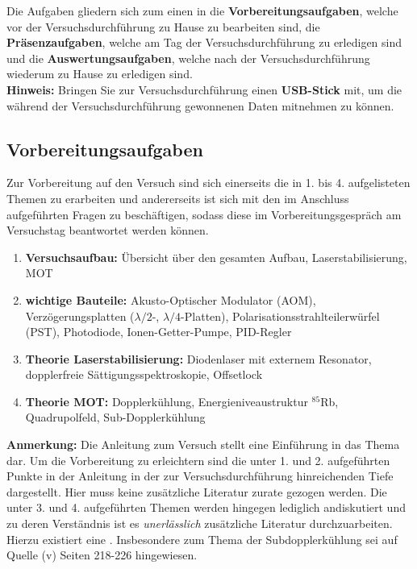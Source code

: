\documentclass[
class=book,
accentcolor=1b,
custommargins=geometry,
fontsize=11pt,
thesis={type=Versuchsanleitung},
ruledheaders=all,
headline=false,
instbox=false,
marginpar=false,
title=small,
ignore-missing-data=true,
twoside=false,
pdfa=false %
]{apqpub}
\begin{document}
Die Aufgaben gliedern sich zum einen in die \textbf{Vorbereitungsaufgaben}, welche vor der Versuchsdurchführung zu Hause zu bearbeiten sind, die \textbf{Präsenzaufgaben}, welche am Tag der Versuchsdurchführung zu erledigen sind und die \textbf{Auswertungsaufgaben}, welche nach der Versuchsdurchführung wiederum zu Hause zu erledigen sind.\\

\textbf{Hinweis:} Bringen Sie zur Versuchsdurchführung einen  \textbf{USB-Stick} mit, um die während der Versuchsdurchführung gewonnenen Daten mitnehmen zu können.

\subsection{Vorbereitungsaufgaben}

Zur Vorbereitung auf den Versuch sind sich einerseits die in 1. bis 4. aufgelisteten Themen zu erarbeiten und andererseits ist sich mit den im Anschluss aufgeführten Fragen zu beschäftigen, sodass diese im Vorbereitungsgespräch am Versuchstag beantwortet werden können. 

\begin{enumerate}
	\item \textbf{Versuchsaufbau:} Übersicht über den gesamten Aufbau, Laserstabilisierung, MOT
	
	\item \textbf{wichtige Bauteile:} Akusto-Optischer Modulator (AOM), Verzögerungsplatten ($\lambda/2$-, $\lambda/4$-Platten), Polarisationsstrahlteilerwürfel (PST), Photodiode, Ionen-Getter-Pumpe, PID-Regler
	
	\item \textbf{Theorie Laserstabilisierung:} Diodenlaser mit externem Resonator, dopplerfreie Sättigungsspektroskopie, Offsetlock
	
	\item \textbf{Theorie MOT:} Dopplerkühlung, Energieniveaustruktur $^{85}$Rb, Quadrupolfeld, Sub-Dopplerkühlung   
\end{enumerate}

\textbf{Anmerkung:} Die Anleitung zum Versuch stellt eine Einführung in das Thema dar. Um die Vorbereitung zu erleichtern sind die unter 1. und 2. aufgeführten Punkte in der Anleitung in der zur Versuchsdurchführung hinreichenden Tiefe dargestellt. Hier muss keine zusätzliche Literatur zurate gezogen werden. Die unter 3. und 4. aufgeführten Themen werden hingegen lediglich andiskutiert und zu deren Verständnis ist es \textit{unerlässlich} zusätzliche Literatur durchzuarbeiten. Hierzu existiert eine . Insbesondere zum Thema der Subdopplerkühlung sei auf Quelle (v) Seiten 218-226 hingewiesen.\\
\end{document}
